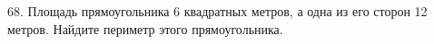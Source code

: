 68. Площадь прямоугольника 6 квадратных метров, а одна из его сторон 12 метров. Найдите периметр этого прямоугольника.\\
